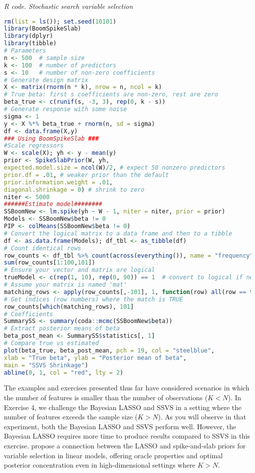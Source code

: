 \begin{tcolorbox}[enhanced,width=4.67in,center upper,
	fontupper=\large\bfseries,drop shadow southwest,sharp corners]
	\textit{R code. Stochastic search variable selection}
	\begin{VF}
		\begin{lstlisting}[language=R]
rm(list = ls()); set.seed(10101)
library(BoomSpikeSlab)
library(dplyr)
library(tibble)
# Parameters
n <- 500  # sample size
k <- 100  # number of predictors
s <- 10   # number of non-zero coefficients
# Generate design matrix
X <- matrix(rnorm(n * k), nrow = n, ncol = k)
# True beta: first s coefficients are non-zero, rest are zero
beta_true <- c(runif(s, -3, 3), rep(0, k - s))
# Generate response with some noise
sigma <- 1
y <- X %*% beta_true + rnorm(n, sd = sigma)
df <- data.frame(X,y)
### Using BoomSpikeSlab ###
#Scale regressors
W <- scale(X); yh <- y - mean(y)
prior <- SpikeSlabPrior(W, yh, 
expected.model.size = ncol(W)/2, # expect 50 nonzero predictors
prior.df = .01, # weaker prior than the default
prior.information.weight = .01,
diagonal.shrinkage = 0) # shrink to zero
niter <- 5000
######Estimate model########
SSBoomNew <- lm.spike(yh ~ W - 1, niter = niter, prior = prior)
Models <- SSBoomNew$beta != 0
PIP <- colMeans(SSBoomNew$beta != 0)
# Convert the logical matrix to a data frame and then to a tibble
df <- as.data.frame(Models); df_tbl <- as_tibble(df)
# Count identical rows
row_counts <- df_tbl %>% count(across(everything()), name = "frequency") %>% arrange(desc(frequency))
sum(row_counts[1:100,101])
# Ensure your vector and matrix are logical
trueModel <- c(rep(1, 10), rep(0, 90)) == 1  # convert to logical if needed
# Assume your matrix is named 'mat'
matching_rows <- apply(row_counts[,-101], 1, function(row) all(row == trueModel))
# Get indices (row numbers) where the match is TRUE
row_counts[which(matching_rows), 101]
# Coefficients
SummarySS <- summary(coda::mcmc(SSBoomNew$beta))
# Extract posterior means of beta
beta_post_mean <- SummarySS$statistics[, 1]
# Compare true vs estimated
plot(beta_true, beta_post_mean, pch = 19, col = "steelblue",
xlab = "True beta", ylab = "Posterior mean of beta",
main = "SSVS Shrinkage")
abline(0, 1, col = "red", lty = 2)
\end{lstlisting}
	\end{VF}
\end{tcolorbox}

The examples and exercises presented thus far have considered scenarios in which the number of features is smaller than the number of observations ($K < N$). In Exercise 4, we challenge the Bayesian LASSO and SSVS in a setting where the number of features exceeds the sample size ($K > N$). As you will observe in that experiment, both the Bayesian LASSO and SSVS perform well. However, the Bayesian LASSO requires more time to produce results compared to SSVS in this exercise. \cite{rockova2018spike} propose a connection between the LASSO and spike-and-slab priors for variable selection in linear models, offering oracle properties and optimal posterior concentration even in high-dimensional settings where $K > N$.

